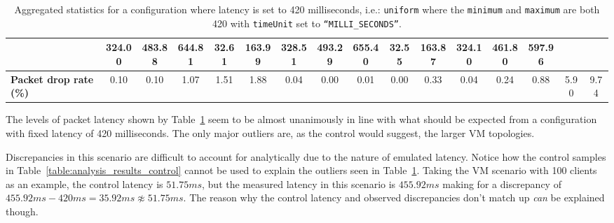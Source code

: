 \begin{table}[!h]
{\begin{tabular}{|l|ccccc|ccccc|ccccc|}
            & \multicolumn{1}{c|}{324.00}
            & \multicolumn{1}{c|}{483.88}
            & \multicolumn{1}{c|}{644.81}
            & \multicolumn{1}{c|}{32.61}
            & \multicolumn{1}{c|}{163.99}
            & \multicolumn{1}{c|}{328.51}
            & \multicolumn{1}{c|}{493.29}
            & \multicolumn{1}{c|}{655.40}
            & \multicolumn{1}{c|}{32.55}
            & \multicolumn{1}{c|}{163.87}
            & \multicolumn{1}{c|}{324.10}
            & \multicolumn{1}{c|}{461.80}
            & \multicolumn{1}{c|}{597.96}
            \\ \hline
            \textbf{Packet drop rate (\%)} & \multicolumn{1}{c|}{0.10} & \multicolumn{1}{c|}{0.10}
            & \multicolumn{1}{c|}{1.07}
            & \multicolumn{1}{c|}{1.51}
            & \multicolumn{1}{c|}{1.88}
            & \multicolumn{1}{c|}{0.04}
            & \multicolumn{1}{c|}{0.00}
            & \multicolumn{1}{c|}{0.01}
            & \multicolumn{1}{c|}{0.00}
            & \multicolumn{1}{c|}{0.33}
            & \multicolumn{1}{c|}{0.04}
            & \multicolumn{1}{c|}{0.24}
            & \multicolumn{1}{c|}{0.88}
            & \multicolumn{1}{c|}{5.90}
            & \multicolumn{1}{c|}{9.74}
            \\ \hline
        \end{tabular}
    }
    \caption{Aggregated statistics for a configuration where latency is set to 420 milliseconds, i.e.:
    \texttt{uniform} where the \texttt{minimum} and \texttt{maximum} are both 420 with \texttt{timeUnit} set to
    \texttt{``MILLI\_SECONDS''}.}
    \label{table:analysis_results_latency}
\end{table}

The levels of packet latency shown by Table~\ref{table:analysis_results_latency} seem to be almost unanimously in
line with what should be expected from a configuration with fixed latency of 420 milliseconds. The only major outliers
are, as the control would suggest, the larger VM topologies.

Discrepancies in this scenario are difficult to account for analytically due to the nature of emulated latency.
Notice how the control samples in Table~\ref{table:analysis_results_control} cannot be used to explain the outliers
seen in Table~\ref{table:analysis_results_latency}. Taking the VM scenario with 100 clients as an example, the
control latency is $51.75ms$, but the measured latency in this scenario is $455.92ms$ making for a discrepancy of
$455.92ms - 420ms = 35.92ms \not\approx 51.75ms$. The reason why the control latency and observed discrepancies don't
match up \emph{can} be explained though.

